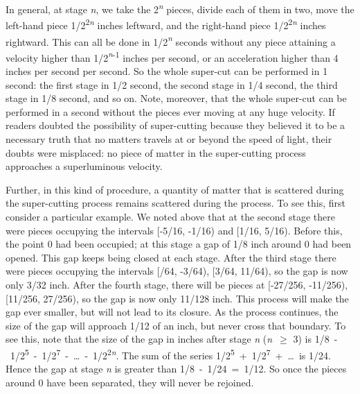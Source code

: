 In general, at stage \textit{n}, we take the 2\textit{\textsuperscript{n}}\textsuperscript{} pieces, divide each of them in two, move the left\nobreakdash-hand piece 1/2\textsuperscript{2}\textit{\textsuperscript{n}} inches leftward, and the right\nobreakdash-hand piece 1/2\textsuperscript{2}\textit{\textsuperscript{n}} inches rightward. This can all be done in 1/2\textit{\textsuperscript{n}} seconds without any piece attaining a velocity higher than 1/2\textit{\textsuperscript{n}}\textsuperscript{{}-1} inches per second, or an acceleration higher than 4 inches per second per second. So the whole super-cut can be performed in 1 second: the first stage in 1/2 second, the second stage in 1/4 second, the third stage in 1/8 second, and so on. Note, moreover, that the whole super-cut can be performed in a second without the pieces ever moving at any huge velocity. If readers doubted the possibility of super-cutting because they believed it to be a necessary truth that no matters travels at or beyond the speed of light, their doubts were misplaced: no piece of matter in the super-cutting process approaches a superluminous velocity. 

Further, in this kind of procedure, a quantity of matter that is scattered during the super-cutting process remains scattered during the process. To see this, first consider a particular example. We noted above that at the second stage there were pieces occupying the intervals [-5/16, -1/16) and [1/16, 5/16). Before this, the point 0 had been occupied; at this stage a gap of 1/8 inch around 0 had been opened. This gap keeps being closed at each stage. After the third stage there were pieces occupying the intervals [/64, -3/64), [3/64, 11/64), so the gap is now only 3/32 inch. After the fourth stage, there will be pieces at [-27/256, -11/256), [11/256, 27/256), so the gap is now only 11/128 inch. This process will make the gap ever smaller, but will not lead to its closure. As the process continues, the size of the gap will approach 1/12 of an inch, but never cross that boundary. To see this, note that the size of the gap in inches after stage \textit{n} (\textit{n}~${\geq}$ 3) is 1/8~\nobreakdash-~1/2\textsuperscript{5}~\nobreakdash-~1/2\textsuperscript{7}~\nobreakdash-~{\dots}~\nobreakdash-~1/2\textsuperscript{2}\textit{\textsuperscript{n}}\textsuperscript{}. The sum of the series 1/2\textsuperscript{5}~+~1/2\textsuperscript{7}~+~{\dots}~is 1/24. Hence the gap at stage \textit{n} is greater than 1/8~-~1/24~=~1/12. So once the pieces around 0 have been separated, they will never be rejoined.

